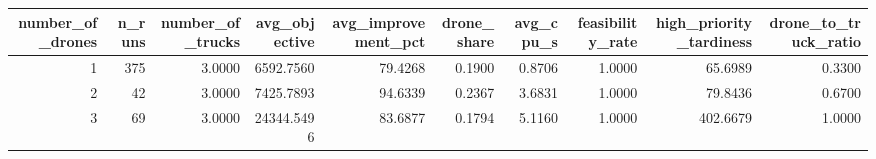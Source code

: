 \begin{tabular}{rrrrrrrrrr}
\toprule
number_of_drones & n_runs & number_of_trucks & avg_objective & avg_improvement_pct & drone_share & avg_cpu_s & feasibility_rate & high_priority_tardiness & drone_to_truck_ratio \\
\midrule
1 & 375 & 3.0000 & 6592.7560 & 79.4268 & 0.1900 & 0.8706 & 1.0000 & 65.6989 & 0.3300 \\
2 & 42 & 3.0000 & 7425.7893 & 94.6339 & 0.2367 & 3.6831 & 1.0000 & 79.8436 & 0.6700 \\
3 & 69 & 3.0000 & 24344.5496 & 83.6877 & 0.1794 & 5.1160 & 1.0000 & 402.6679 & 1.0000 \\
\bottomrule
\end{tabular}
